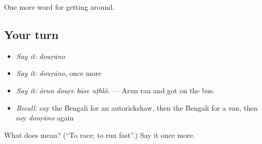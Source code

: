 \begin{grammarlens}[title={What you've built}]
One more word for getting around.
\end{grammarlens}

\subsection*{Your turn}
\begin{itemize}
\raggedright
  \item \emph{Say it:} \emph{douṛāno}
  \item \emph{Say it:} \emph{douṛāno}, once more
  \item \emph{Say it:} \emph{ôrun douṛe bāse uṭhlô.} — Arun ran and got on the bus.
  \item \emph{Recall:} say the Bengali for an autorickshaw, then the Bengali for a van, then say \emph{douṛāno} again
\end{itemize}

\begin{tcolorbox}[breakable,colback=teal!4,colframe=teal!35!black,title={Before you move on}]
What does  mean? (\textquotedblleft{}To race; to run fast\textquotedblright{}.) Say it once more.
\end{tcolorbox}

